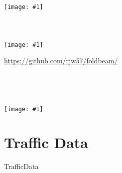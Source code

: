 \documentclass[aspectratio=169]{beamer}
\newcommand{\wideimage}[1]{%
  \begin{frame}
    \centering
    \texttt{[image: \#1]}
    \\
  \end{frame}
}
\begin{document}
\begin{frame}
  \inputminted{python}{PredefinedLocationLinks/structure_out.py}
\end{frame}

\begin{frame}
  \inputminted{python}{wgs84-links.py}
\end{frame}

\wideimage{img/wgs84-links.pdf}

\begin{frame}
  \inputminted[lastline=7]{python}{bng-links.py}
\end{frame}

\begin{frame}
  \inputminted[firstline=9, lastline=19]{python}{bng-links.py}
\end{frame}

\begin{frame}
  \inputminted[firstline=21, lastline=31]{python}{bng-links.py}
\end{frame}

\wideimage{img/bng-links.pdf}

\begin{frame}
  \centering
  \parbox{0.6\textwidth}{%
    \url{https://github.com/rjw57/foldbeam/}
    \\
    \vspace{2\baselineskip}
    \inputminted{console}{foldbeam-render.sh}
  }
  \\
\end{frame}

\begin{frame}
  \inputminted[firstline=33, lastline=40]{python}{bng-links.py}
\end{frame}

\wideimage{img/bng-links-2.pdf}

\section{Traffic Data}

\begin{frame}
  \centering\Huge
  TrafficData
  \\
\end{frame}

\begin{frame}
  \inputminted{xml}{TrafficData/content.xml}
\end{frame}

\begin{frame}
  \inputminted{python}{TrafficData/parse.py}
\end{frame}
\end{document}
